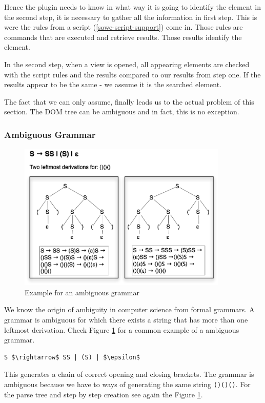 Hence the plugin needs to know in what way it is going to identify the element in the second step, it is necessary to gather all the information in first step. This is were the rules from a script (\ref{sowe-script-support}) come in. Those rules are commands that are executed and retrieve results. Those results identify the element. 

In the second step, when a view is opened, all appearing elements are checked with the script rules and the results compared to our results from step one. If the results appear to be the same - we assume it is the searched element. 

The fact that we can only assume, finally leads us to the actual problem of this section. The DOM tree can be ambiguous and in fact, this is no exception.

\subsubsection{Ambiguous Grammar}
\begin{figure}\centering
		\includegraphics[width=10cm]{images/ambiguous-grammar.png}
		\caption{Example for an ambiguous grammar}
		\label{ambiguous-grammar-pic}
\end{figure} 

We know the origin of ambiguity in computer science from formal grammars. A grammar is ambiguous for which there exists a string that has more than one leftmost derivation. Check Figure \ref{ambiguous-grammar-pic} for a common example of a ambiguous grammar.
\begin{lstlisting}[mathescape]
S $\rightarrow$ SS | (S) | $\epsilon$
\end{lstlisting}
This generates a chain of correct opening and closing brackets. The grammar is ambiguous because we have to ways of generating the same string \verb^()()()^. For the parse tree and step by step creation see again the Figure \ref{ambiguous-grammar-pic}.

